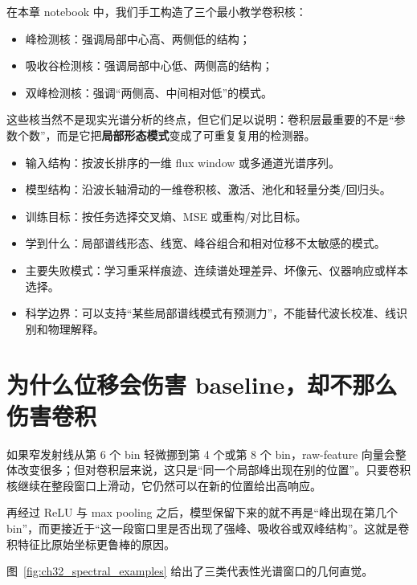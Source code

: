 在本章 notebook 中，我们手工构造了三个最小教学卷积核：

\begin{itemize}
    \item 峰检测核：强调局部中心高、两侧低的结构；
    \item 吸收谷检测核：强调局部中心低、两侧高的结构；
    \item 双峰检测核：强调“两侧高、中间相对低”的模式。
\end{itemize}

这些核当然不是现实光谱分析的终点，但它们足以说明：卷积层最重要的不是“参数个数”，而是它把\textbf{局部形态模式}变成了可重复复用的检测器。

\begin{examplebox}
\begin{itemize}
    \item 输入结构：按波长排序的一维 flux window 或多通道光谱序列。
    \item 模型结构：沿波长轴滑动的一维卷积核、激活、池化和轻量分类/回归头。
    \item 训练目标：按任务选择交叉熵、MSE 或重构/对比目标。
    \item 学到什么：局部谱线形态、线宽、峰谷组合和相对位移不太敏感的模式。
    \item 主要失败模式：学习重采样痕迹、连续谱处理差异、坏像元、仪器响应或样本选择。
    \item 科学边界：可以支持“某些局部谱线模式有预测力”，不能替代波长校准、线识别和物理解释。
\end{itemize}
\end{examplebox}

\section{为什么位移会伤害 baseline，却不那么伤害卷积}

如果窄发射线从第 6 个 bin 轻微挪到第 4 个或第 8 个 bin，raw-feature 向量会整体改变很多；但对卷积层来说，这只是“同一个局部峰出现在别的位置”。只要卷积核继续在整段窗口上滑动，它仍然可以在新的位置给出高响应。

再经过 ReLU 与 max pooling 之后，模型保留下来的就不再是“峰出现在第几个 bin”，而更接近于“这一段窗口里是否出现了强峰、吸收谷或双峰结构”。这就是卷积特征比原始坐标更鲁棒的原因。

图~\ref{fig:ch32_spectral_examples} 给出了三类代表性光谱窗口的几何直觉。


